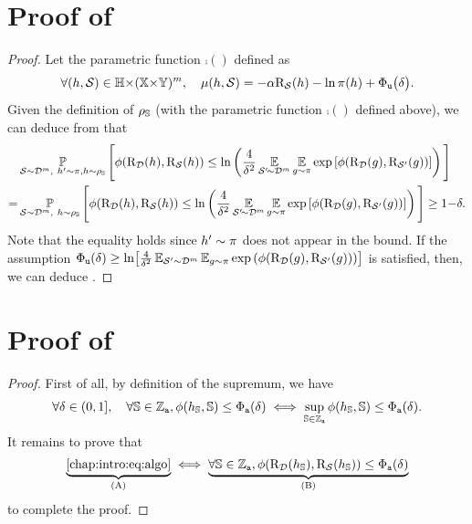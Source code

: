 \begin{noaddcontents}
\section{Proof of }
\label{ap:dis-mu:sec:proof-cor-dis-uc}

\corollarydisuc*
\begin{proof}
Let the parametric function $\comp()$ defined as
\begin{align*}
    \forall (h,\mathcal{S})\in\mathbb{H}{\times}(\mathbb{X}{\times}\mathbb{Y})^m,\quad \operatorname{\mu}(h, \mathcal{S}) = -\alpha\text{R}_{\mathcal{S}}(h) -\ln\pi(h) + \Phi_{{\tt u}}\big(\delta\big).
\end{align*}
Given the definition of $\rho_{\mathbb{S}}$ (with the parametric function $\comp()$ defined above), we can deduce from  that
\begin{align*}
    &\operatorname*{\mathbb{P}}_{\mathcal{S}\sim\mathcal{D}^m,\ h'\sim\pi, h\sim\rho_{\mathbb{S}}}\Bigg[ \phi(\text{R}_{\mathcal{D}}(h), \text{R}_{\mathcal{S}}(h)) \le \ln\left( \frac{4}{\delta^2} \operatorname*{\mathbb{E}}_{\mathcal{S}'\!{\sim}\mathcal{D}^m}\operatorname*{\mathbb{E}}_{g{\sim}\pi} \exp\left[\phi(\text{R}_{\mathcal{D}}(g),\text{R}_{\mathcal{S}'}(g))\right]\right) \Bigg]\\
    = &\operatorname*{\mathbb{P}}_{\mathcal{S}\sim\mathcal{D}^m,\ h\sim\rho_{\mathbb{S}}}\Bigg[ \phi(\text{R}_{\mathcal{D}}(h), \text{R}_{\mathcal{S}}(h)) \le \ln\left( \frac{4}{\delta^2} \operatorname*{\mathbb{E}}_{\mathcal{S}'\!{\sim}\mathcal{D}^m}\operatorname*{\mathbb{E}}_{g{\sim}\pi} \exp\left[\phi(\text{R}_{\mathcal{D}}(g),\text{R}_{\mathcal{S}'}(g))\right]\right) \Bigg] \ge 1{-}\delta.
\end{align*}
Note that the equality holds since $h'\sim\pi$ does not appear in the bound. 
If the assumption $\Phi_{{\tt u}}(\delta) \ge \ln\!\left[ \frac{4}{\delta^2} \operatorname*{\mathbb{E}}_{\mathcal{S}'{\sim}\mathcal{D}^m}\operatorname*{\mathbb{E}}_{g{\sim}\pi} \exp\left(\phi(\text{R}_{\mathcal{D}}(g),\text{R}_{\mathcal{S}'}(g))\right)\right]$ is satisfied, then, we can deduce .
\end{proof}

\section{Proof of }
\label{ap:dis-mu:sec:proof-prop-algo}

\propositionalgodep*
\begin{proof}
First of all, by definition of the supremum, we have
\begin{align*}
    \forall\delta\in(0,1],\quad \forall\mathbb{S}\in\mathbb{Z}_{{\tt a}}, \phi(h_{\mathbb{S}}, \mathbb{S}) \le \Phi_{{\tt a}}(\delta) \iff  \sup_{\mathbb{S}\in\mathbb{Z}_{{\tt a}}}\phi(h_{\mathbb{S}}, \mathbb{S}) \le \Phi_{{\tt a}}(\delta).
\end{align*}
It remains to prove that 
\begin{align*}
    \underbrace{\text{\Cref{chap:intro:eq:algo}}}_{\text{(A)}} \iff \underbrace{\forall\S\in\setA,  \phi(\Risk_{\D}(\h_{\S}), \Risk_{\dS}(\h_{\S})) \le \PhiA(\delta)}_{\text{(B)}}
\end{align*}
to complete the proof.


\end{proof}
\end{noaddcontents}
